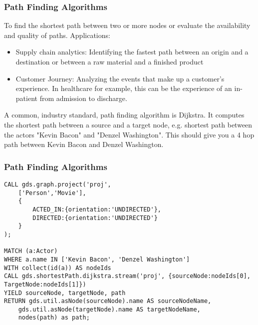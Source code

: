 \begin{frame}[fragile]\frametitle{Path Finding Algorithms}

 To find the shortest path between two or more nodes or evaluate the availability and quality of paths. Applications:
 
\begin{itemize}
\item  Supply chain analytics: Identifying the fastest path between an origin and a destination or between a raw material and a finished product
\item  Customer Journey: Analyzing the events that make up a customer’s experience. In healthcare for example, this can be the experience of an in-patient from admission to discharge.
\end{itemize}

A common, industry standard, path finding algorithm is Dijkstra. It computes the shortest path between a source and a target node, e.g. shortest path between the actors "Kevin Bacon" and "Denzel Washington". This should give you a 4 hop path between Kevin Bacon and Denzel Washington.

\end{frame}


\begin{frame}[fragile]\frametitle{Path Finding Algorithms}

\begin{lstlisting}
CALL gds.graph.project('proj',
    ['Person','Movie'],
    {
        ACTED_IN:{orientation:'UNDIRECTED'},
        DIRECTED:{orientation:'UNDIRECTED'}
    }
);

MATCH (a:Actor)
WHERE a.name IN ['Kevin Bacon', 'Denzel Washington']
WITH collect(id(a)) AS nodeIds
CALL gds.shortestPath.dijkstra.stream('proj', {sourceNode:nodeIds[0], TargetNode:nodeIds[1]})
YIELD sourceNode, targetNode, path
RETURN gds.util.asNode(sourceNode).name AS sourceNodeName,
    gds.util.asNode(targetNode).name AS targetNodeName,
    nodes(path) as path;
\end{lstlisting}


\end{frame}

